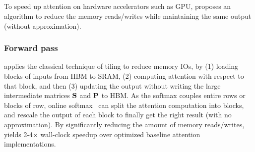 \subsection{\sysnameone}
\label{subsec:flashv1}

To speed up attention on hardware accelerators such as GPU,
\citep{dao2022flashattention} proposes an algorithm to reduce the memory
reads/writes while maintaining the same output (without approximation).

\subsubsection{Forward pass}
\sysnameone applies the classical technique of tiling to reduce memory IOs, by
(1) loading blocks of inputs from HBM to SRAM, (2) computing attention with
respect to that block, and then (3) updating the output without writing the
large intermediate matrices $\mathbf{S}$ and $\mathbf{P}$ to HBM.
As the softmax couples entire rows or blocks of row, online
softmax~\citep{milakov2018online, rabe2021self} can split the attention
computation into blocks, and rescale the output of each block to finally get the
right result (with no approximation).
By significantly reducing the amount of memory reads/writes, \sysnameone yields
2-4$\times$ wall-clock speedup over optimized baseline attention implementations.

